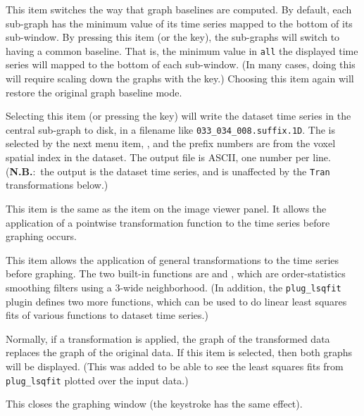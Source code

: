 \begin{description}
   This item switches the way that graph baselines
                    are computed.  By default, each sub-graph has the
                    minimum value of its time series mapped to the bottom
                    of its sub-window.  By pressing this item
                    (or the  key), the sub-graphs will switch to
                   having a common baseline.  That is, the minimum
                   value in {\tt all\/} the displayed time series will mapped
                   to the bottom of each sub-window.  (In many cases, doing
                   this will require scaling down the graphs with the \kq{-} key.)
                   Choosing this item again will restore the original
                   graph baseline mode.

   Selecting this item (or pressing the  key) will
                       write the dataset time series in the central sub-graph to
                       disk, in a filename like {\tt 033\_034\_008.suffix.1D}\@.
                       The 
                       is selected by the next menu item, ,
                       and the prefix numbers are from the voxel spatial index
                       in the dataset.
                       The output file is ASCII, one number per line.
                       ({\bf N.B.}:~the output is the dataset time series,
                        and is unaffected by the {\tt Tran} transformations below.)

   This item is the same as the  item on
                  the image viewer  panel.  It allows the
                  application of a pointwise transformation function to
                  the time series before graphing occurs.

    This item allows the application of general
                   transformations to the time series before graphing.
                   The two built-in  functions are
                    and , which are
                   order-statistics smoothing filters using a 3-wide neighborhood.
                   (In addition, the {\tt plug\_lsqfit} plugin defines two
                   more functions, which can be used to do linear least squares
                   fits of various functions to dataset time series.)

    Normally, if a  transformation is
                       applied, the graph of the transformed data replaces
                       the graph of the original data.  If this item is
                       selected, then both graphs will be displayed.
                       (This was added to be able to see the least squares
                        fits from {\tt plug\_lsqfit} plotted over the input data.)

    This closes the graphing window (the keystroke  has the
                same effect).
\end{description}



